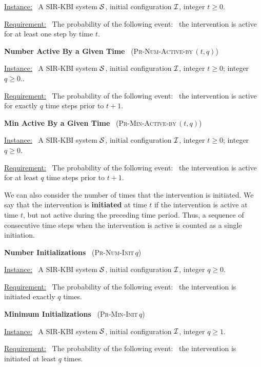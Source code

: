 \documentclass[11pt]{article}
\newcommand{\cali}{\mbox{${\cal I}$}}
\newcommand{\cals}{\mbox{${\cal S}$}}
\newcommand{\NumInits}{\mbox{\textsc{Pr-Num-Init}$\,q$}}
\newcommand{\MinInits}{\mbox{\textsc{Pr-Min-Init}$\,q$}}
\newcommand{\NumActiveBy}{\mbox{\textsc{Pr-Num-Active-by}$\,(t,q)$}}
\newcommand{\MinActiveBy}{\mbox{\textsc{Pr-Min-Active-by}$\,(t,q)$}}
\begin{document}
\medskip
\noindent
\underline{Instance:}~ A SIR-KBI system \cals,
initial configuration \cali, integer $t \geq 0$.

\smallskip
\noindent
\underline{Requirement:}~ The probability of the following
event:~ the intervention is active for at least one step by time $t$.



\bigskip

\noindent
\textbf{Number Active By a Given Time}~ (\NumActiveBy)

\medskip
\noindent
\underline{Instance:}~ A SIR-KBI system \cals,
initial configuration \cali, integer $t \geq 0$; integer $q \geq 0$..

\smallskip
\noindent
\underline{Requirement:}~ The probability of the following
event:~ the intervention is active for exactly $q$ time steps prior to $t+1$.


\bigskip

\noindent
\textbf{Min Active By a Given Time}~ (\MinActiveBy)

\medskip
\noindent
\underline{Instance:}~ A SIR-KBI system \cals,
initial configuration \cali, integer $t \geq 0$; integer $q \geq 0$.

\smallskip
\noindent
\underline{Requirement:}~ The probability of the following
event:~ the intervention is active for at least $q$ time steps prior to $t+1$.


\bigskip

We can also consider the number of times that the intervention is initiated.
We say that the intervention is {\bf initiated} at time $t$ if the intervention is active at time $t$,
but not active during the preceding time period.
Thus, a sequence of consecutive time steps when the intervention is active is counted
as a single initiation.


\bigskip
\noindent
\textbf{Number Initializations}~ (\NumInits)

\medskip
\noindent
\underline{Instance:}~ A SIR-KBI system \cals,
initial configuration \cali, integer $q \geq 0$.

\smallskip
\noindent
\underline{Requirement:}~ The probability of the following
event:~ the intervention is initiated exactly $q$ times.


\bigskip
\noindent
\textbf{Minimum Initializations}~ (\MinInits)

\medskip
\noindent
\underline{Instance:}~ A SIR-KBI system \cals,
initial configuration \cali, integer $q \geq 1$.

\smallskip
\noindent
\underline{Requirement:}~ The probability of the following
event:~ the intervention is initiated at least $q$ times.
\end{document}
